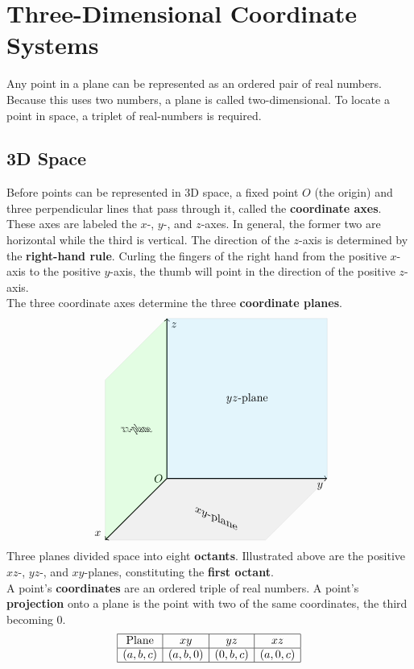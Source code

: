 \documentclass[../Calculus_\Roman{3}]{subfiles}
\begin{document}
	\section{Three-Dimensional Coordinate Systems}
		Any point in a plane can be represented as an ordered pair of real numbers. Because this uses two numbers, a plane is called two-dimensional. To locate a point in space, a triplet of real-numbers is required.
		\subsection*{3D Space}
			Before points can be represented in 3D space, a fixed point $O$ (the origin) and three perpendicular lines that pass through it, called the \textbf{coordinate axes}. These axes are labeled the $x$-, $y$-, and $z$-axes. In general, the former two are horizontal while the third is vertical. The direction of the $z$-axis is determined by the \textbf{right-hand rule}. Curling the fingers of the right hand from the positive $x$-axis to the positive $y$-axis, the thumb will point in the direction of the positive $z$-axis. \\
			The three coordinate axes determine the three \textbf{coordinate planes}.
			\[\begin{tikzpicture}[xscale = 5, yscale = 5]
				\coordinate (O) at (0, 0, 0) node[anchor = east]{$O$};
				\draw[thick, ->] (0, 0, 0) -- (1, 0, 0) node[anchor = north east]{$y$};
				\draw[thick, ->] (0, 0, 0) -- (0, 1, 0) node[anchor = north west]{$z$};
				\draw[thick, ->] (0, 0, 0) -- (0, 0, 1) node[anchor = south east]{$x$};
				\draw[fill = cyan, opacity = 0.1] (0, 0, 0) -- (1, 0, 0) -- (1, 1, 0) -- (0, 1, 0);
					\node at (0.5, 0.5, 0) {$yz$-plane};
				\draw[fill = green, opacity = 0.1] (0, 0, 0) -- (0, 1, 0) -- (0, 1, 1) -- (0, 0, 1);
					\node[xslant = -0.7, xscale = 0.7] at (0, 0.5, 0.5) {$xz$-plane};
				\draw[fill = gray, opacity = 0.1] (0, 0, 0) -- (0, 0, 1) -- (1, 0, 1) -- (1, 0, 0);
					\node[below, yslant = -0.45] at (0.5, 0, 0.5) {$xy$-plane};
			\end{tikzpicture}\]
			Three planes divided space into eight \textbf{octants}. Illustrated above are the positive $xz$-, $yz$-, and $xy$-planes, constituting the \textbf{first octant}. \\
			A point's \textbf{coordinates} are an ordered triple of real numbers. A point's \textbf{projection} onto a plane is the point with two of the same coordinates, the third becoming 0.
			\[\begin{array}{|c|c|c|c|}\hline
				\text{Plane} & xy & yz & xz \\\hline
				(a, b, c) & (a, b, 0) & (0, b, c) & (a, 0, c) \\\hline
			\end{array}\]
\end{document}

